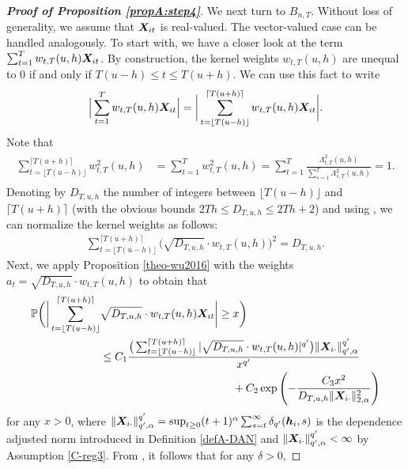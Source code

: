 \documentclass[12pt]{article}
\makeatletter
\renewcommand{\eqref}[1]{\tagform@{\ref{#1}}}
\makeatother
\begin{document}
\begin{proof}[\textnormal{\textbf{Proof of Proposition \ref{propA:step4}}}]
We next turn to $B_{n,T}$. Without loss of generality, we assume that $\boldsymbol{X}_{it}$ is real-valued. The vector-valued case can be handled analogously. To start with, we have a closer look at the term $\sum_{t=1}^T w_{t,T}(u,h) \boldsymbol{X}_{it}$. By construction, the kernel weights $w_{t, T}(u, h)$ are unequal to $0$ if and only if $T(u-h) \le t \le T(u+h)$. We can use this fact to write
\begin{align*}
\Big| \sum_{t=1}^T w_{t,T}(u,h) \boldsymbol{X}_{it} \Big|  = \bigg| \sum_{t=\lfloor T(u-h) \rfloor}^{\lceil T(u+h) \rceil} w_{t,T}(u,h) \boldsymbol{X}_{it}   \bigg|.
\end{align*}
Note that
\begin{align}\label{eq:sum_weights}
\begin{split}
\sum_{t=\lfloor T(u-h) \rfloor}^{\lceil T(u+h) \rceil} w^2_{t,T}(u,h) &= \sum_{t=1}^T w^2_{t,T}(u,h) = \sum_{t=1}^T\frac{\Lambda^2_{t,T}(u,h)}{\sum\nolimits_{s=1}^T\Lambda^2_{s,T}(u,h) } = 1.
\end{split}
\end{align}
Denoting by $D_{T, u, h}$ the number of integers between $\lfloor T(u-h) \rfloor$ and $\lceil T(u+h) \rceil$ (with the obvious bounds $2Th \leq D_{T, u, h} \leq 2Th + 2$) and using \eqref{eq:sum_weights}, we can normalize the kernel weights as follows:
\begin{align*}
\sum_{t=\lfloor T(u-h) \rfloor}^{\lceil T(u+h) \rceil} \big(\sqrt{D_{T, u, h}}\cdot w_{t,T}(u,h)\big)^2 = D_{T, u, h}.
\end{align*}
Next, we apply Proposition \ref{theo-wu2016} with the weights $a_t = \sqrt{D_{T, u, h}}\cdot w_{t,T}(u,h)$ to obtain that
\begin{align}
\mathbb{P} \bigg(\bigg| \sum_{t=\lfloor T(u-h) \rfloor}^{\lceil T(u+h) \rceil} & \sqrt{D_{T, u, h}}\cdot w_{t,T}(u,h) \boldsymbol{X}_{it}  \bigg| \geq x\bigg) \nonumber \\
 & \leq C_1 \frac{\big( \sum_{t=\lfloor T(u-h) \rfloor}^{\lceil T(u+h) \rceil} |\sqrt{D_{T, u, h}}\cdot w_{t,T}(u,h)|^{q^\prime}\big) \| \boldsymbol{X}_{i \cdot}\|^{q^\prime}_{q^\prime, \alpha}}{ x^{q^\prime}} \nonumber \\
 & \qquad \qquad \qquad \qquad \qquad \qquad + C_2 \exp \left(-\frac{C_3  x^2}{D_{T, u, h}\| \boldsymbol{X}_{i\cdot}\|^{2}_{2, \alpha}}\right) \label{ineq-diff-8}
\end{align}
for any $x > 0$, where $\| \boldsymbol{X}_{i\cdot}\|^{q^\prime}_{q^\prime, \alpha} = \sup_{t\geq 0} (t+1)^{\alpha} \sum_{s=t}^{\infty}\delta_{q^\prime}(\boldsymbol{h}_i, s)$ is the dependence adjusted norm introduced in Definition \ref{defA-DAN} and $\| \boldsymbol{X}_{i\cdot}\|^{q^\prime}_{q^\prime, \alpha} < \infty$ by Assumption \ref{C-reg3}. From \eqref{ineq-diff-8}, it follows that for any $\delta > 0$, 

\end{proof}
\end{document}
